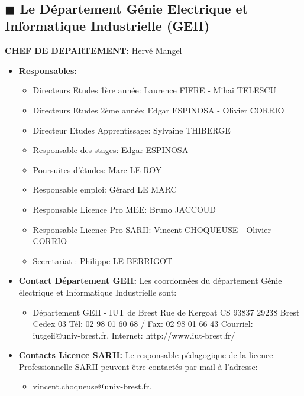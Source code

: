 \documentclass[11pt]{article}
\newcommand{\mysubsection}[1]
{~\\
{\noindent
\begin{minipage}{\linewidth}
\subsection*{$\blacksquare$ #1}
\end{minipage}
}
}
\begin{document}
\mysubsection{Le Département Génie Electrique et Informatique Industrielle (GEII)}
\vspace{3em}
\begin{center}
\textbf{CHEF DE DEPARTEMENT:} Hervé Mangel

\end{center}
\begin{figure}[!h]
\centering
\end{figure}
\begin{multicols*}{2}
\raggedcolumns
\renewcommand{\labelitemi}{\footnotesize $\blacksquare$}
\begin{itemize}
\itemsep 0.4cm
\item \textbf{Responsables:}\\

\begin{itemize}
\item Directeurs Etudes 1ère année: Laurence FIFRE - Mihai TELESCU
\item Directeurs Etudes 2ème année: Edgar ESPINOSA - Olivier CORRIO
\item Directeur Etudes Apprentissage: Sylvaine THIBERGE
\item Responsable des stages: Edgar ESPINOSA
\item Poursuites d'études: Marc LE ROY
\item Responsable emploi: Gérard LE MARC
\item Responsable Licence Pro MEE: Bruno JACCOUD
\item Responsable Licence Pro SARII: Vincent CHOQUEUSE - Olivier CORRIO
\item Secretariat : Philippe LE BERRIGOT\\
\end{itemize}
\item \textbf{Contact Département GEII:} Les coordonnées du département Génie électrique et Informatique Industrielle sont:\\

\begin{itemize}
\item Département GEII - IUT de Brest
Rue de Kergoat
CS 93837
29238 Brest Cedex 03
Tél: 02 98 01 60 68 / Fax: 02 98 01 66 43
Courriel: iutgeii@univ-brest.fr, Internet: http://www.iut-brest.fr/
\end{itemize}


\item \textbf{Contacts Licence SARII:} Le responsable pédagogique de la licence Professionnelle SARII peuvent être contactés par mail à l'adresse: \\

\begin{itemize}
\item vincent.choqueuse@univ-brest.fr.
\end{itemize}
\end{itemize}
\end{multicols*}
\end{document}
